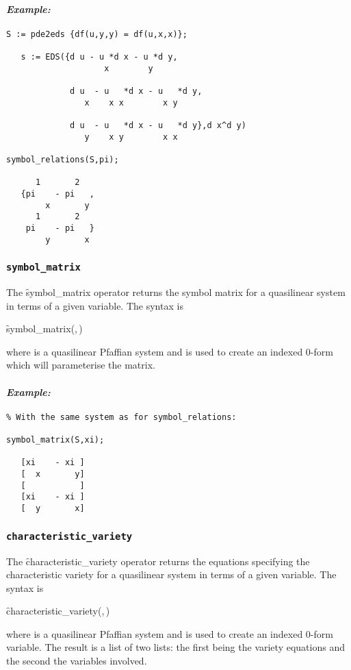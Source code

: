 \paragraph{\it Example:}
\begin{verbatim}
S := pde2eds {df(u,y,y) = df(u,x,x)};

   s := EDS({d u - u *d x - u *d y,
                    x        y
   
             d u  - u   *d x - u   *d y,
                x    x x        x y

             d u  - u   *d x - u   *d y},d x^d y)
                y    x y        x x

symbol_relations(S,pi);

      1       2 
   {pi    - pi   ,
        x       y 
      1       2 
    pi    - pi   }
        y       x 
\end{verbatim}

\subsubsection{\tt symbol\_matrix}
\label{symbol_matrix}

The \f{symbol\_matrix} operator returns the symbol matrix for a quasilinear
system in terms of a given variable. The syntax is
\begin{syntax}
  \f{symbol\_matrix}(,\,)
\end{syntax}
where  is a quasilinear Pfaffian system and  is
used to create an indexed 0-form which will parameterise the matrix.

\paragraph{\it Example:}
\begin{verbatim}
% With the same system as for symbol_relations:

symbol_matrix(S,xi);

   [xi    - xi ]
   [  x       y]
   [           ]
   [xi    - xi ]
   [  y       x]
\end{verbatim}

\subsubsection{\tt characteristic\_variety}
\label{characteristic_variety}

The \f{characteristic\_variety} operator returns the equations specifying
the characteristic variety for a quasilinear
system in terms of a given variable. The syntax is
\begin{syntax}
  \f{characteristic\_variety}(,\,)
\end{syntax}
where  is a quasilinear Pfaffian system and  is
used to create an indexed 0-form variable. The result is a list of two
lists: the first being the variety equations and the second the variables
involved.

